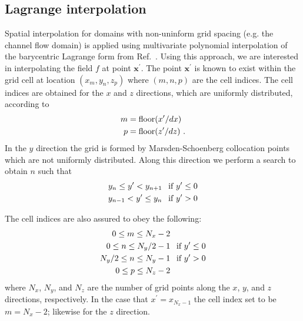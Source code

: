 \documentclass[11pt]{article}
\begin{document}
\subsection{Lagrange interpolation}
Spatial interpolation for domains with non-uninform grid spacing (e.g. the
channel flow domain) is applied using multivariate polynomial interpolation of
the barycentric Lagrange form from Ref.~\cite{Berrut2004}. Using this approach,
we are interested in interpolating the field $f$ at point $\bm{x}^\prime$. The
point $\bm{x}^\prime$ is known to exist within the grid cell at location
$(x_m,y_n,z_p)$ where $(m,n,p)$ are the cell indices. The cell indices are
obtained for the $x$ and $z$ directions, which are uniformly distributed,
according to
\begin{align}
  m &= \text{floor}( x^\prime / dx ) \\
  p &= \text{floor}( z^\prime / dz ) \mbox{ .} \notag
\end{align}
In the $y$ direction the grid is formed by Marsden-Schoenberg collocation points
which are not uniformly distributed. Along this direction we perform a search to obtain $n$ such that 
\begin{align}
  y_n  \leq y^\prime < y_{n+1} &\text{\hspace{1ex} if } y^\prime \leq 0 \\
  y_{n-1} < y^\prime \leq y_n &\text{\hspace{1ex} if } y^\prime > 0 \notag
\end{align}

The cell indices are also assured to obey the following:
\begin{align}
  0 \leq m \leq N_x - 2 & \notag \\
  0 \leq n \leq N_y/2 - 1 &\text{\hspace{1ex} if } y^\prime \leq 0 \\
  N_y/2 \leq n \leq N_y - 1 &\text{\hspace{1ex} if } y^\prime > 0 \notag \\
  0 \leq p \leq N_z - 2 &\notag
\end{align}
where $N_x$, $N_y$, and $N_z$ are the number of grid points along the $x$, $y$, and
$z$ directions, respectively. In the case that $x^\prime = x_{N_x-1}$ the cell index set to be $m=N_x-2$; likewise for the $z$ direction.
 
\end{document}
